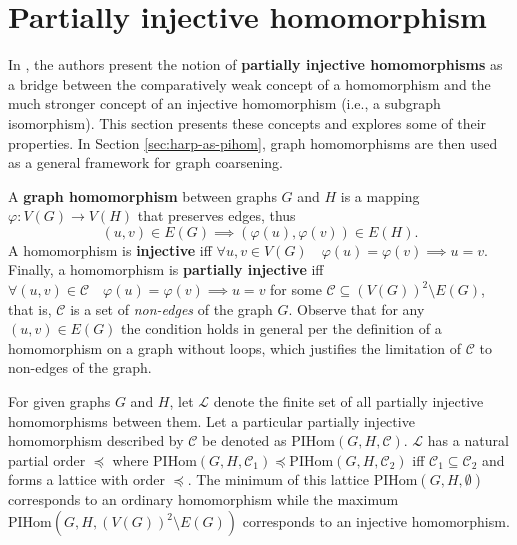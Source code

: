 \section{Partially injective homomorphism}

In \cite{schulz_mining_2019}, the authors present the notion of \textbf{partially injective homomorphisms} as a bridge between the comparatively weak concept of a homomorphism and the much stronger concept of an injective homomorphism (i.e., a subgraph isomorphism). This section presents these concepts and explores some of their properties. In Section \ref{sec:harp-as-pihom}, graph homomorphisms are then used as a general framework for graph coarsening.

A \textbf{graph homomorphism} between graphs \( G \) and \( H \) is a mapping \( \varphi: V \left( G \right) \to V \left( H \right) \) that preserves edges, thus
\[ \left( u, v \right) \in E \left( G \right) \implies \left( \varphi \left( u \right), \varphi \left( v \right) \right) \in E \left( H \right) \text{.} \]
A homomorphism is \textbf{injective} iff \( \forall u, v \in V \left( G \right) \quad \varphi \left( u \right) = \varphi \left( v \right) \implies u = v \text{.} \)
Finally, a homomorphism is \textbf{partially injective} iff
\( \forall \left( u, v \right) \in \mathcal{C} \quad \varphi \left( u \right) = \varphi \left( v \right) \implies u = v \)
for some \( \mathcal{C} \subseteq \left( V \left( G \right) \right)^2 \setminus E \left( G \right) \), that is, \( \mathcal{C} \) is a set of \textit{non-edges} of the graph \( G \).
Observe that for any \( \left( u, v \right) \in E \left( G \right) \) the condition holds in general per the definition of a homomorphism on a graph without loops, which justifies the limitation of \( \mathcal{C} \) to non-edges of the graph.

For given graphs \( G \) and \( H \), let \( \mathcal{L} \) denote the finite set of all partially injective homomorphisms between them. Let a particular partially injective homomorphism described by \( \mathcal{C} \) be denoted as \( \mathrm{PIHom} \left( G, H, \mathcal{C} \right) \). \( \mathcal{L} \) has a natural partial order \( \preceq \) where \( \mathrm{PIHom} \left( G, H, \mathcal{C}_1 \right) \preceq \mathrm{PIHom} \left( G, H, \mathcal{C}_2 \right) \) iff \( \mathcal{C}_1 \subseteq \mathcal{C}_2 \) and forms a lattice with order \( \preceq \). The minimum of this lattice \( \mathrm{PIHom} \left( G, H, \emptyset \right) \) corresponds to an ordinary homomorphism while the maximum \(\mathrm{PIHom} \left( G, H, \left( V \left( G \right) \right)^2 \setminus E \left( G \right) \right) \) corresponds to an injective homomorphism.
